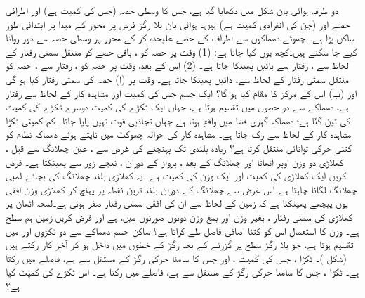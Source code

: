 دو طرفہ ہوائی بان شکل  میں دکھایا گیا ہے، جس کا وسطی حصہ  (جس کی کمیت    ہے)   اور اطرافی حصے  اور   (جن کی   انفرادی  کمیت  ہے) ہیں۔ ہوائی بان بلا رگڑ فرش پر  محور کے مبدا پر ابتدائی طور ساکن پڑا ہے۔ چھوٹے دھماکوں  سے اطراف کے حصے علیحدہ کر کے  محور پر وسطی حصہ سے دور روانا کیے جا سکتے ہیں۔کچھ یوں کیا جاتا ہے: (1)  وقت  پر  حصہ  کو   ،   باقی حصے کو منتقل سمتی  رفتار کے لحاظ سے ،  رفتار سے بائیں پھینکا جاتا ہے۔ (2) اس کے بعد، وقت  پر   حصہ  کو ،  رفتار سے ،  حصہ   کو منتقل  سمتی رفتار کے لحاظ سے، دائیں پھینکا جاتا ہے۔ وقت  پر (ا)  حصہ  کی سمتی رفتار کیا ہو گی  اور (ب)  اس کے مرکز کا مقام کیا ہو گا؟
  ایک جسم جس کی کمیت   اور مشاہدہ کار کے لحاظ سے رفتار  ہے، دھماکے سے دو حصوں میں تقسیم ہوتا ہے، جہاں ایک ٹکڑے کی کمیت دوسرے ٹکڑے کی کمیت کی تین گنّا ہے؛ دھماکہ گہری فضا میں واقع ہوتا ہے جہاں تجاذبی قوت نہیں پایا جاتا۔ کم کمیتی ٹکڑا مشاہدہ کار کے لحاظ سے رک جاتا ہے۔ مشاہدہ کار کی حوالہ چھوکٹ  میں ناپتے ہوئے دھماکہ نظام کو کتنی حرکی توانائی منتقل کرتا ہے؟
زیادہ بلندی تک پہنچنے   کی غرض سے   ، عین  چھلانگ     سے قبل ، کھلاڑی دو    وزن  اوپر اٹھاتا اور چھلانگ کے بعد  ، پرواز کے دوران ، نیچے  زور سے  پھینکتا ہے۔  فرض کریں  ایک  کھلاڑی کی کمیت  اور   ایک وزن کی کمیت  ہے۔ یہ کھلاڑی بلند چھلانگ کی بجائے لمبی چھلانگ لگانا چاہتا ہے۔اس غرض سے چھلانگ کے دوران بلند ترین نقطہ پر پہنچ کر کھلاڑی وزن افقی یوں  پیچھے  پھینکتا ہے کہ زمین کے لحاظ سے ان کی افقی سمتی  رفتار صفر ہوتی ہے۔لمحہ  اٹھان پر کھلاڑی کی سمتی رفتار ، بغیر وزن اور بمع وزن دونوں صورتوں میں،  ہے اور فرض کریں زمین ہم سطح ہے۔ وزن کا استعمال اس کو کتنا  اضافی فاصل طے کراتا ہے؟
ساکن جسم دھماکے سے دو ٹکڑوں  اور  میں تقسیم ہوتا ہے، جو بلا رگڑ سطح  پر  گزرنے کے بعد  رگڑ کے خطوں میں داخل ہو کر آخر کار رکتے ہیں (شکل )۔ ٹکڑا ، جس کی کمیت  ، اور جس   کا  سامنا  حرکی رگڑ کے مستقل سے  ہے،  فاصلے میں رکتا ہے۔  ٹکڑا ، جس   کا  سامنا  حرکی رگڑ کے مستقل سے  ہے،  فاصلے میں رکتا ہے۔ اس ٹکڑے کی کمیت کیا ہے؟
